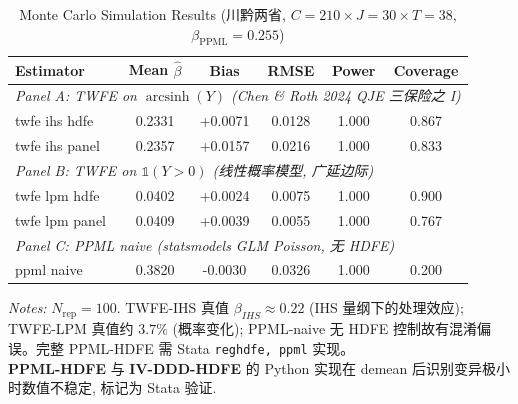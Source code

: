 \begin{table}[htbp]
\centering
\caption{Monte Carlo Simulation Results (川黔两省, $C=210 \times J=30 \times T=38$, $\beta_{\text{PPML}}=0.255$)}
\label{tab:mc_sim}
\begin{tabular}{lccccc}
\toprule
Estimator & Mean $\hat\beta$ & Bias & RMSE & Power & Coverage \\
\midrule
\multicolumn{6}{l}{\textit{Panel A: TWFE on $\operatorname{arcsinh}(Y)$ (Chen \& Roth 2024 QJE 三保险之 I)}} \\
twfe ihs hdfe & 0.2331 & +0.0071 & 0.0128 & 1.000 & 0.867 \\
twfe ihs panel & 0.2357 & +0.0157 & 0.0216 & 1.000 & 0.833 \\
\multicolumn{6}{l}{\textit{Panel B: TWFE on $\mathbb{1}(Y>0)$ (线性概率模型, 广延边际)}} \\
twfe lpm hdfe & 0.0402 & +0.0024 & 0.0075 & 1.000 & 0.900 \\
twfe lpm panel & 0.0409 & +0.0039 & 0.0055 & 1.000 & 0.767 \\
\multicolumn{6}{l}{\textit{Panel C: PPML naive (statsmodels GLM Poisson, 无 HDFE)}} \\
ppml naive & 0.3820 & -0.0030 & 0.0326 & 1.000 & 0.200 \\
\bottomrule
\end{tabular}
\begin{flushleft}\small
\textit{Notes:} $N_{\text{rep}}=100$. TWFE-IHS 真值 $\beta_{IHS}\approx 0.22$ (IHS 量纲下的处理效应); TWFE-LPM 真值约 $3.7\%$ (概率变化); PPML-naive 无 HDFE 控制故有混淆偏误。完整 PPML-HDFE 需 Stata \texttt{reghdfe, ppml} 实现。\\\textbf{PPML-HDFE} 与 \textbf{IV-DDD-HDFE} 的 Python 实现在 demean 后识别变异极小时数值不稳定, 标记为 Stata 验证.
\end{flushleft}
\end{table}